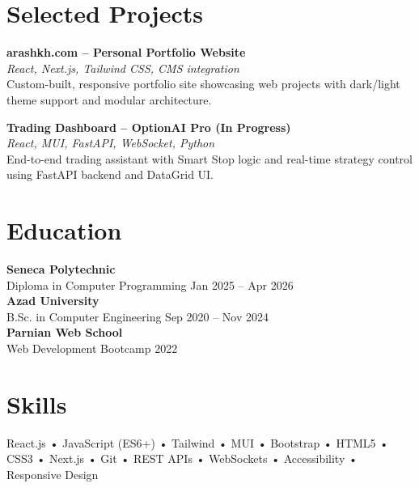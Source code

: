\documentclass[letterpaper,11pt]{article}
\begin{document}
\vspace{0.6em}

\section*{Selected Projects}
\textbf{arashkh.com – Personal Portfolio Website}\\
\textit{React, Next.js, Tailwind CSS, CMS integration}\\
Custom-built, responsive portfolio site showcasing web projects with dark/light theme support and modular architecture.

\vspace{0.5em}

\textbf{Trading Dashboard – OptionAI Pro (In Progress)}\\
\textit{React, MUI, FastAPI, WebSocket, Python}\\
End-to-end trading assistant with Smart Stop logic and real-time strategy control using FastAPI backend and DataGrid UI.

\vspace{0.6em}

\section*{Education}
\textbf{Seneca Polytechnic}\\
Diploma in Computer Programming \hfill Jan 2025 -- Apr 2026\\

\textbf{Azad University}\\
B.Sc. in Computer Engineering \hfill Sep 2020 -- Nov 2024\\

\textbf{Parnian Web School}\\
Web Development Bootcamp \hfill 2022

\vspace{0.6em}

\section*{Skills}
React.js • JavaScript (ES6+) • Tailwind • MUI • Bootstrap • HTML5 • CSS3 • Next.js • Git • REST APIs • WebSockets • Accessibility • Responsive Design
\end{document}
